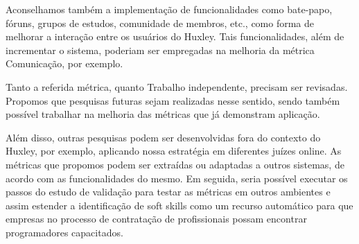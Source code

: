 Aconselhamos também a implementação de funcionalidades como bate-papo, fóruns, grupos de estudos, comunidade de membros, etc., como forma de melhorar a interação entre os usuários do Huxley. Tais funcionalidades, além de incrementar o sistema, poderiam ser empregadas na melhoria da métrica Comunicação, por exemplo.

Tanto a referida métrica, quanto Trabalho independente, precisam ser revisadas. Propomos que pesquisas futuras sejam realizadas nesse sentido, sendo também possível trabalhar na melhoria das métricas que já demonstram aplicação.

Além disso, outras pesquisas podem ser desenvolvidas fora do contexto do Huxley, por exemplo, aplicando nossa estratégia em diferentes juízes online. As métricas que propomos podem ser extraídas ou adaptadas a outros sistemas, de acordo com as funcionalidades do mesmo. Em seguida, seria possível executar os passos do estudo de validação para testar as métricas em outros ambientes e assim estender a identificação de soft skills como um recurso automático para que empresas no processo de contratação de profissionais possam encontrar programadores capacitados.


